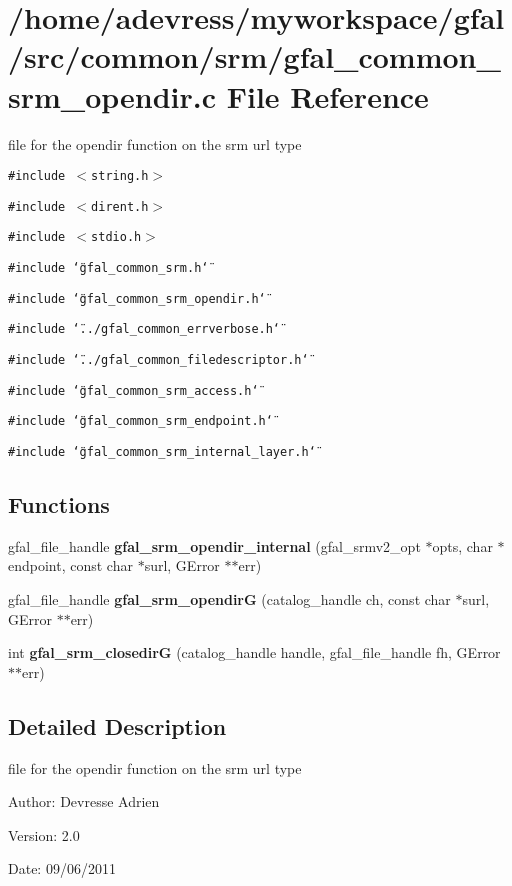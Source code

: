 \section{/home/adevress/myworkspace/gfal/src/common/srm/gfal\_\-common\_\-srm\_\-opendir.c File Reference}
\label{gfal__common__srm__opendir_8c}
file for the opendir function on the srm url type 

{\tt \#include $<$string.h$>$}\par
{\tt \#include $<$dirent.h$>$}\par
{\tt \#include $<$stdio.h$>$}\par
{\tt \#include \char`\"{}gfal\_\-common\_\-srm.h\char`\"{}}\par
{\tt \#include \char`\"{}gfal\_\-common\_\-srm\_\-opendir.h\char`\"{}}\par
{\tt \#include \char`\"{}../gfal\_\-common\_\-errverbose.h\char`\"{}}\par
{\tt \#include \char`\"{}../gfal\_\-common\_\-filedescriptor.h\char`\"{}}\par
{\tt \#include \char`\"{}gfal\_\-common\_\-srm\_\-access.h\char`\"{}}\par
{\tt \#include \char`\"{}gfal\_\-common\_\-srm\_\-endpoint.h\char`\"{}}\par
{\tt \#include \char`\"{}gfal\_\-common\_\-srm\_\-internal\_\-layer.h\char`\"{}}\par
\subsection*{Functions}
\begin{CompactItemize}
\item 
gfal\_\-file\_\-handle \textbf{gfal\_\-srm\_\-opendir\_\-internal} (gfal\_\-srmv2\_\-opt $\ast$opts, char $\ast$endpoint, const char $\ast$surl, GError $\ast$$\ast$err)\label{gfal__common__srm__opendir_8c_328539269e85b42a470ed35e16aa0be7}

\item 
gfal\_\-file\_\-handle \textbf{gfal\_\-srm\_\-opendir\-G} (catalog\_\-handle ch, const char $\ast$surl, GError $\ast$$\ast$err)\label{gfal__common__srm__opendir_8c_98735cc394e8308aff0d47bb13fda64f}

\item 
int \textbf{gfal\_\-srm\_\-closedir\-G} (catalog\_\-handle handle, gfal\_\-file\_\-handle fh, GError $\ast$$\ast$err)\label{gfal__common__srm__opendir_8c_a9f63a5ff1be26668963f98f2fba9733}

\end{CompactItemize}


\subsection{Detailed Description}
file for the opendir function on the srm url type 

\begin{Desc}
\item[Author:]Devresse Adrien \end{Desc}
\begin{Desc}
\item[Version:]2.0 \end{Desc}
\begin{Desc}
\item[Date:]09/06/2011 \end{Desc}
